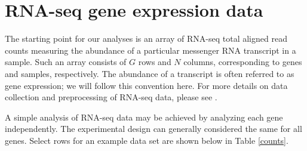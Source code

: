 \section{RNA-seq gene expression data}
\label{sec:data}
The starting point for our analyses is an array of RNA-seq total aligned read counts measuring the abundance of a particular messenger RNA transcript in a sample. Such an array consists of $G$ rows and $N$ columns, corresponding to genes and samples, respectively. The abundance of a transcript is often referred to as gene expression; we will follow this convention here. For more details on data collection and preprocessing of RNA-seq data, please see \citet{datta2014}.

A simple analysis of RNA-seq data may be achieved by analyzing each gene independently. The experimental design can generally considered the same for all genes. Select rows for an example data set are shown below in Table \ref{counts}.

\begin{table}[ht]
\centering
\begin{minipage}{.8\textwidth}
\caption{\small Selected rows from RNA-seq data set showing total aligned read counts for selected genes. Columns are grouped by genotype. Exemplar genes for different types of heterosis are shown.}
\label{counts}
\end{minipage}
\\[.25cm]
\end{table}
% 
